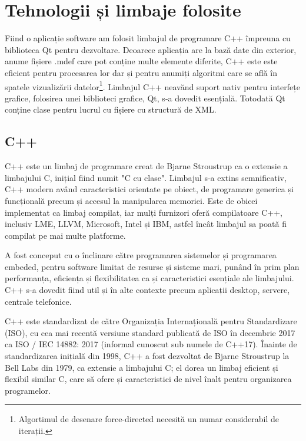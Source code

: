 \newpage
\section{Tehnologii și limbaje folosite}

Fiind o aplicație software am folosit limbajul de programare C++ împreuna cu biblioteca Qt pentru dezvoltare. Deoarece aplicația are la 
bază date din exterior, anume fișiere .mdef care pot conține multe elemente diferite, C++ este este eficient pentru procesarea lor
dar și pentru anumiți algoritmi care se află în spatele vizualizării datelor\footnote{Algortimul de desenare force-directed necesită un numar considerabil de iterații.}.
Limbajul C++ neavănd suport nativ pentru interfețe grafice, folosirea unei biblioteci grafice, Qt, s-a dovedit esențială. 
Totodată Qt conține clase pentru lucrul cu fișiere cu structură de XML.

\subsection{C++}

C++ este un limbaj de programare creat de Bjarne Stroustrup ca o extensie a limbajului C, inițial fiind numit "C cu clase". 
Limbajul s-a extins semnificativ, C++ modern având caracteristici orientate pe obiect, de programare generica și funcțională 
precum și accesul la manipularea memoriei. Este de obicei implementat ca limbaj compilat, iar mulți furnizori oferă 
compilatoare C++, inclusiv LME, LLVM, Microsoft, Intel și IBM, astfel încât limbajul sa poată fi compilat pe mai multe platforme.\newline 

A fost conceput cu o înclinare către programarea sistemelor și programarea embeded, pentru software limitat de resurse și sisteme mari, 
punând în prim plan performanța, eficiența și flexibilitatea ca și caracteristici esențiale ale limbajului. C++ s-a dovedit 
fiind util și în alte contexte precum aplicații desktop, servere, centrale telefonice.\newline

C++ este standardizat de către Organizația Internațională pentru Standardizare (ISO), cu cea mai recentă versiune standard 
publicată de ISO în decembrie 2017 ca ISO / IEC 14882: 2017 (informal cunoscut sub numele de C++17). Înainte de standardizarea 
inițială din 1998, C++ a fost dezvoltat de Bjarne Stroustrup la Bell Labs din 1979, ca extensie a 
limbajului C; el dorea un limbaj eficient și flexibil similar C, care să ofere și caracteristici de nivel înalt pentru organizarea 
programelor. \cite{cpp}\newline

